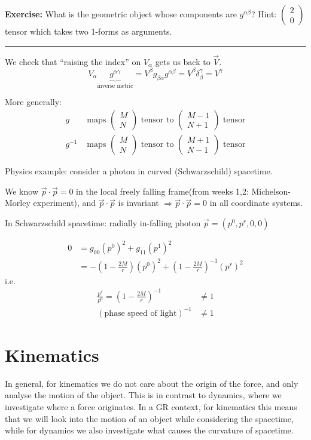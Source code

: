 \documentclass[a4paper]{article} %
\newcommand{\exercise}[2]
{
\begin{framed}
\textbf{Exercise:} #1 \\\hrule
#2
\end{framed}
}
\newcommand{\pmx}[1]{
\begin{pmatrix}
#1
\end{pmatrix}
}
\begin{document}
\exercise{What is the geometric object whose components are $g^{\alpha\beta}$? Hint: $\pmx{2\\0}$ tensor which takes two 1-forms as arguments.}{}

We check that ``raising the index'' on $V_{\alpha}$ gets us back to $\vec{V}$.
\begin{equation}
V_{\alpha}\underbrace{g^{\alpha\gamma}}_{\text{inverse metric}}=
V^{\beta}g_{\beta\alpha}g^{\alpha\beta}=V^{\beta}\delta_{\beta}^{\gamma}
=V^{\gamma}
\end{equation}

More generally:
\begin{align*}
g&\text{ maps } \pmx{M\\N}\text{ tensor to }\pmx{M-1\\N+1}\text{ tensor}\\
g^{-1}&\text{ maps } \pmx{M\\N}\text{ tensor to }\pmx{M+1\\N-1}\text{ tensor}
\end{align*}

Physics example: consider a photon in curved (Schwarzschild) spacetime. 

We know $\vec{p}\cdot\vec{p}=0$ in the local freely falling frame(from weeks 1,2: Michelson-Morley experiment), and $\vec{p}\cdot\vec{p}$ is invariant $\Rightarrow \vec{p}\cdot\vec{p}=0$ in all coordinate systems. 

In Schwarzschild spacetime: radially in-falling photon $\vec{p}=\left(p^0,p^r,0,0\right)$

\begin{align*}
0&=g_{00}(p^0)^2+g_{11}(p^1)^2\\
&=-\left(1-\frac{2M}{r}\right)(p^0)^2+\left(1-\frac{2M}{r}\right)^{-1}(p^r)^2
\end{align*}
i.e.
\begin{align*}
\frac{p^r}{p^0}=\left(1-\frac{2M}{r}\right)^{-1}&\neq 1\\
(\text{phase speed of light})^{-1}&\neq 1
\end{align*}


\section{Kinematics}
In general, for kinematics we do not care about the origin of the force, and only analyse the motion of the object. This is in contrast to dynamics, where we investigate where a force originates. In a GR context, for kinematics this means that we will look into the motion of an object while considering the spacetime, while for dynamics we also investigate what causes the curvature of spacetime.
\end{document}
